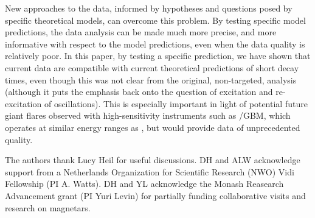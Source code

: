 \documentclass{emulateapj}
\begin{document}
New approaches to the data, informed by hypotheses and questions posed by specific theoretical models, can overcome this problem. By testing specific model predictions, the data analysis can be made much more precise, and more informative with respect to the model predictions, even when the data quality is relatively poor. In this paper, by testing a specific prediction, we have shown that current data are compatible with current theoretical predictions of short decay times, even though this was not clear from the original, non-targeted, analysis (although it puts the emphasis back onto the question of excitation and re-excitation of oscillations). This is especially important in light of potential future giant flares observed with high-sensitivity instruments such as \fermi/GBM, which operates at similar energy ranges as \rhessi, but would provide data of unprecedented quality.

\acknowledgments
The authors thank Lucy Heil for useful discussions. %
DH and ALW acknowledge support from a Netherlands Organization for Scientific Research (NWO) Vidi Fellowship (PI A. Watts).  
DH and YL acknowledge the Monash Reasearch Advancement grant (PI Yuri Levin) for partially funding collaborative visits
and research on magnetars.



\end{document}
